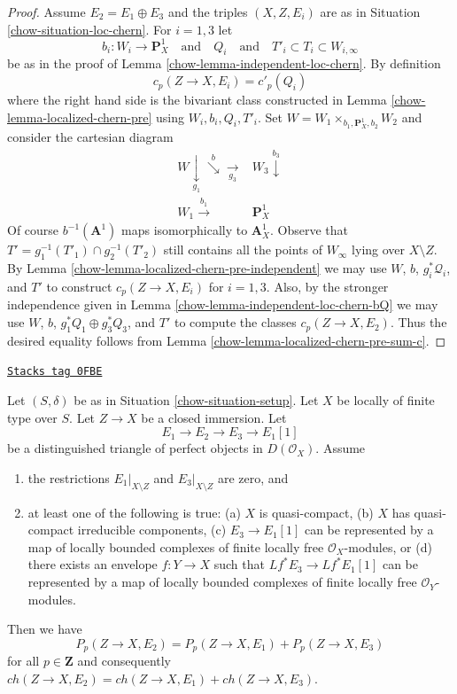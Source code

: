 \begin{proof}
\medskip\noindent
Assume $E_2 = E_1 \oplus E_3$ and the triples $(X, Z, E_i)$
are as in Situation \ref{chow-situation-loc-chern}.
For $i = 1, 3$ let
$$
b_i : W_i \to \mathbf{P}^1_X
\quad\text{and}\quad
Q_i
\quad\text{and}\quad
T'_i \subset T_i \subset W_{i, \infty}
$$
be as in the proof of Lemma \ref{chow-lemma-independent-loc-chern}.
By definition
$$
c_p(Z \to X, E_i) = c'_p(Q_i)
$$
where the right hand side is the bivariant class constructed in
Lemma \ref{chow-lemma-localized-chern-pre} using $W_i, b_i, Q_i, T'_i$.
Set $W = W_1 \times_{b_1, \mathbf{P}^1_X, b_2} W_2$ and consider
the cartesian diagram
$$
\begin{array}{cc}W \underset{g_1}{\downarrow}\overset{b}{\searrow}\underset{g_3}{\longrightarrow} & W_3 \overset{b_3}{\downarrow} \\ W_1 \overset{b_1}{\longrightarrow} & \mathbf{P}^1_X\end{array}
$$
Of course $b^{-1}(\mathbf{A}^1)$ maps isomorphically to $\mathbf{A}^1_X$.
Observe that $T' = g_1^{-1}(T'_1) \cap g_2^{-1}(T'_2)$ still contains
all the points of $W_\infty$ lying over $X \setminus Z$.
By Lemma \ref{chow-lemma-localized-chern-pre-independent} we may use
$W$, $b$, $g_i^*\mathcal{Q}_i$, and
$T'$ to construct $c_p(Z \to X, E_i)$ for $i = 1, 3$.
Also, by the stronger independence given in
Lemma \ref{chow-lemma-independent-loc-chern-bQ} we may use
$W$, $b$, $g_1^*Q_1 \oplus g_3^*Q_3$, and $T'$
to compute the classes $c_p(Z \to X, E_2)$.
Thus the desired equality follows from
Lemma \ref{chow-lemma-localized-chern-pre-sum-c}.
\end{proof}

\begin{lemma}
\label{chow-lemma-additivity-loc-chern-P}
\href{https://stacks.math.columbia.edu/tag/0FBE}{\texttt{Stacks tag 0FBE}}

Let $(S, \delta)$ be as in Situation \ref{chow-situation-setup}.
Let $X$ be locally of finite type over $S$. Let $Z \to X$ be
a closed immersion. Let
$$
E_1 \to E_2 \to E_3 \to E_1[1]
$$
be a distinguished triangle of perfect objects in $D(\mathcal{O}_X)$.
Assume
\begin{enumerate}
\item the restrictions $E_1|_{X \setminus Z}$ and $E_3|_{X \setminus Z}$
are zero, and
\item at least one of the following is true:
(a) $X$ is quasi-compact,
(b) $X$ has quasi-compact irreducible components,
(c) $E_3 \to E_1[1]$ can be represented by a map of locally
bounded complexes of finite locally free $\mathcal{O}_X$-modules, or
(d) there exists an envelope $f : Y \to X$ such that $Lf^*E_3 \to Lf^*E_1[1]$
can be represented by a map of locally bounded complexes of
finite locally free $\mathcal{O}_Y$-modules.
\end{enumerate}
Then we have
$$
P_p(Z \to X, E_2) = P_p(Z \to X, E_1) + P_p(Z \to X, E_3)
$$
for all $p \in \mathbf{Z}$ and consequently
$ch(Z \to X, E_2) = ch(Z \to X, E_1) + ch(Z \to X, E_3)$.
\end{lemma}

